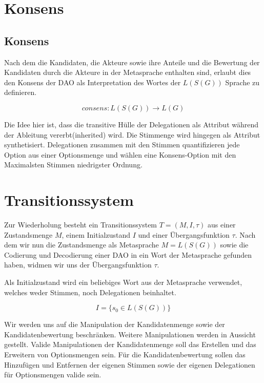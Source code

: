 \documentclass[a4paper,12pt]{report}
\begin{document}
\section{Konsens}


\subsection*{Konsens}

Nach dem die Kandidaten, die Akteure sowie ihre Anteile und die Bewertung der Kandidaten durch die Akteure in der Metasprache enthalten sind, erlaubt dies den Konsens der DAO als Interpretation des Wortes der $L(S(G))$ Sprache zu definieren. 

\[ consens: L(S(G)) \rightarrow L(G) \] 

Die Idee hier ist, dass die transitive Hülle der Delegationen als
Attribut während der Ableitung vererbt(inherited) wird. Die Stimmenge 
wird hingegen als Attribut synthetisiert.\cite{Knuth1968} Delegationen zusammen mit den Stimmen quantifizieren jede Option aus einer Optionsmenge und wählen
eine Konsens-Option mit den Maximalsten Stimmen niedrigster Ordnung.



\section{Transitionssystem}

Zur Wiederholung besteht ein Transitionssystem $T=(M,I,\tau)$ aus einer Zustandsmenge $M$, einem Initialzustand $I$ und einer Übergangsfunktion $\tau$.
Nach dem wir nun die Zustandsmenge als Metasprache $M=L(S(G))$ sowie die Codierung und Decodierung einer DAO in ein Wort der Metasprache gefunden haben, widmen wir uns der Übergangsfunktion $\tau$.

Als Initialzustand wird ein beliebiges Wort aus der Metasprache verwendet, welches weder Stimmen, noch Delegationen beinhaltet.

\[ I = \{s_0\in L(S(G))\} \] 

Wir werden uns auf die Manipulation der Kandidatenmenge sowie der Kandidatenbewertung beschränken. Weitere Manipulationen werden in Aussicht gestellt. Valide Manipulationen der Kandidatenmenge soll das Erstellen und das Erweitern von Optionsmengen sein. Für die Kandidatenbewertung sollen das Hinzufügen und Entfernen der eigenen Stimmen sowie der eigenen Delegationen für Optionsmengen valide sein. 
\end{document}
